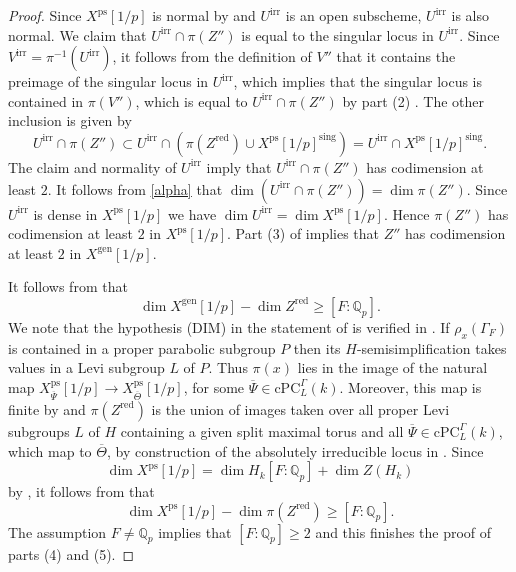 \documentclass{amsart}
\theoremstyle{definition}
\theoremstyle{remark}
\newcommand{\Qp}{\mathbb {Q}_p}
\newcommand{\gen}{\mathrm{gen}}
\newcommand{\red}{\mathrm{red}}
\newcommand{\irr}{\mathrm{irr}}
\newcommand{\cPC}{\mathrm{cPC}}
\newcommand{\Thetabar}{\overline{\Theta}}
\newcommand{\Psibar}{\overline{\Psi}}
\newcommand{\ps}{\mathrm{ps}}
\newcommand{\sing}{\mathrm{sing}}
\begin{document}
\begin{proof}
Since $X^{\ps}[1/p]$ is normal by  and $U^{\irr}$ is an open 
subscheme, $U^{\irr}$ is also normal. 
We claim that $U^{\irr}\cap \pi(Z'')$ is equal to the singular locus in $U^{\irr}$. 
Since $V^{\irr}=\pi^{-1}(U^{\irr})$, 
it follows
from the definition of $V''$ that 
it contains 
the preimage of the singular locus in $U^{\irr}$, which implies that the singular 
locus is contained in $\pi(V'')$, which is equal to $U^{\irr}\cap \pi(Z'')$ by part (2) . The other 
inclusion is given by 
\begin{equation}
U^{\irr}\cap \pi(Z'')\subset U^{\irr} \cap (\pi(Z^{\red})\cup X^{\ps}[1/p]^{\sing})= U^{\irr}\cap X^{\ps}[1/p]^{\sing}.
\end{equation}
The claim and normality of $U^{\irr}$ imply that $U^{\irr}\cap \pi(Z'')$ has codimension at least $2$. It follows from 
\eqref{alpha} that $\dim (U^{\irr}\cap \pi(Z''))= \dim \pi(Z'')$. Since $U^{\irr}$ is dense in $X^{\ps}[1/p]$ we have 
$\dim U^{\irr}=\dim X^{\ps}[1/p]$. 
Hence $\pi(Z'')$ has codimension  at least $2$ in $X^{\ps}[1/p]$. Part (3) 
of  implies that $Z''$ has 
codimension  at least $2$ in
$X^{\gen}[1/p]$.

 It follows from  \cite[Proposition 13.14, 13.17]{defG} that 
 \begin{equation}\label{FQp1}
 \dim X^{\gen}[1/p] - \dim Z^{\red}\ge [F:\Qp].
 \end{equation}
 We note that the hypothesis (DIM) in the statement 
 of \cite[Proposition 13.17]{defG} is verified in 
 \cite[Theorem 13.26]{defG}. 
 If $\rho_x(\Gamma_F)$ is contained in a proper parabolic subgroup $P$ then its $H$-semi\-simp\-li\-fi\-ca\-tion takes values in a Levi subgroup $L$ of $P$. Thus $\pi(x)$ lies in the image of the natural map $X^{\ps}_{\overline{\Psi}}[1/p]\rightarrow X^{\ps}_{\Thetabar}[1/p]$, for some $\Psibar\in \cPC^{\Gamma}_L(k)$.
 Moreover, this map is finite by \cite[Corollary 6.5]{defG} and $\pi(Z^{\red})$ is the union of images taken over all proper Levi subgroups $L$ of $H$ containing a given split maximal 
 torus and all $\Psibar\in \cPC^{\Gamma}_L(k)$, which map to 
 $\Thetabar$, by construction of the absolutely irreducible locus in \cite[Section 9.2]{defG}. Since 
 \begin{equation}
 \dim X^{\ps}[1/p]= \dim H_k [F:\Qp] +\dim Z(H_k)
 \end{equation}
 by \cite[Corollary 13.31]{defG}, it follows from \cite[Proposition 2.16]{defG} that 
 \begin{equation}\label{FQp2}
 \dim X^{\ps}[1/p] - \dim \pi(Z^{\red}) \ge [F:\Qp].
 \end{equation}
 The assumption $F\neq \Qp$ implies that $[F:\Qp]\ge 2$ and this finishes the proof of parts (4) and (5).
\end{proof}
\end{document}

